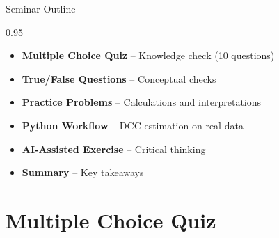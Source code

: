 \documentclass[9pt, aspectratio=169, t]{beamer}
\subtitle{Seminar 5b: Multivariate GARCH Models}
\begin{document}
{
\begin{frame}
    \titlepage
\end{frame}
}

\begin{frame}{Seminar Outline}
    \begin{cminipage}{0.95\textwidth}
    \begin{itemize}\setlength{\itemsep}{0pt}
        \item \textbf{Multiple Choice Quiz} -- Knowledge check (10 questions)
        \vspace{0.15cm}
        \item \textbf{True/False Questions} -- Conceptual checks
        \vspace{0.15cm}
        \item \textbf{Practice Problems} -- Calculations and interpretations
        \vspace{0.15cm}
        \item \textbf{Python Workflow} -- DCC estimation on real data
        \vspace{0.15cm}
        \item \textbf{AI-Assisted Exercise} -- Critical thinking
        \vspace{0.15cm}
        \item \textbf{Summary} -- Key takeaways
    \end{itemize}
    \end{cminipage}
\end{frame}

\section{Multiple Choice Quiz}
\end{document}
